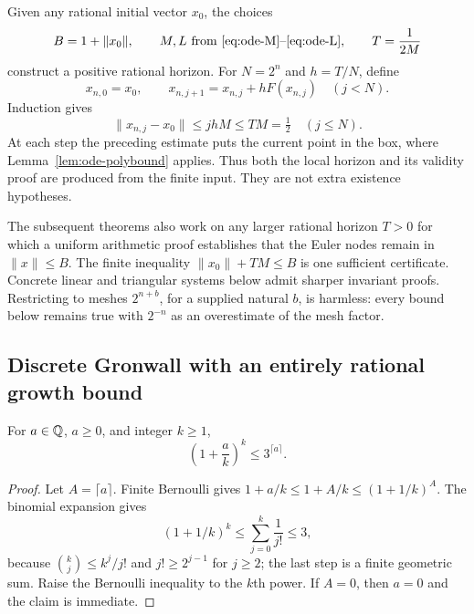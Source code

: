 Given any rational initial vector $x_0$, the choices
\begin{equation}
 B=1+\lVert x_0\rVert,\qquad M,L\text{ from
 \eqref{eq:ode-M}--\eqref{eq:ode-L}},\qquad T=\frac1{2M}
 \label{eq:ode-localhorizon}
\end{equation}
construct a positive rational horizon.  For $N=2^n$ and $h=T/N$, define
\begin{equation}
 x_{n,0}=x_0,\qquad x_{n,j+1}=x_{n,j}+hF(x_{n,j})\quad(j<N).
 \label{eq:ode-euler}
\end{equation}
Induction gives
\begin{equation}
 \lVert x_{n,j}-x_0\rVert\le jhM\le TM=\tfrac12\quad(j\le N).
 \label{eq:ode-invariant}
\end{equation}
At each step the preceding estimate puts the current point in the box,
where Lemma~\ref{lem:ode-polybound} applies.  Thus both the local horizon
and its validity proof are produced from the finite input.  They are not
extra existence hypotheses.

The subsequent theorems also work on any larger rational horizon $T>0$
for which a uniform arithmetic proof establishes that the Euler nodes
remain in $\lVert x\rVert\le B$.  The finite inequality
$\lVert x_0\rVert+TM\le B$ is one sufficient certificate.  Concrete linear
and triangular systems below admit sharper invariant proofs.  Restricting
to meshes $2^{n+b}$, for a supplied natural $b$, is harmless: every bound
below remains true with $2^{-n}$ as an overestimate of the mesh factor.

\subsection{Discrete Gronwall with an entirely rational growth bound}

\begin{lemma}
\label{lem:ode-growth}
For $a\in\mathbb Q$, $a\ge0$, and integer $k\ge1$,
\[
 \left(1+\frac ak\right)^k\le3^{\lceil a\rceil}.
\]
\end{lemma}
\begin{proof}
Let $A=\lceil a\rceil$.  Finite Bernoulli gives
$1+a/k\le1+A/k\le(1+1/k)^A$.  The binomial expansion gives
\[
 (1+1/k)^k\le\sum_{j=0}^k\frac1{j!}\le3,
\]
because $\binom{k}{j}\le k^j/j!$ and $j!\ge2^{j-1}$ for $j\ge2$;
the last step is a finite geometric sum.  Raise the Bernoulli inequality
to the $k$th power.  If $A=0$, then $a=0$ and the claim is immediate.
\end{proof}

